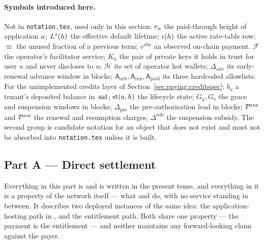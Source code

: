\paragraph{Symbols introduced here.}
Not in \texttt{notation.tex}, used only in this section: $e_{a}$ the paid-through height of
application $a$; $L^{\ast}(h)$ the effective default lifetime; $\iota(h)$ the active
rate-table row; $\varpi$ the unused fraction of a previous term; $v^{\mathrm{obs}}$ an observed
on-chain payment.  $\mathcal{F}$
the operator's facilitator service; $K_u$ the pair of private keys it holds in trust for user $u$ and
never discloses to $u$; $\mathcal{H}$ its set
of operator hot wallets;  $\Delta_{\mathrm{adv}}$ its
early-renewal advance window in blocks; $\mathsf{A}_{\mathrm{orb}}, \mathsf{A}_{\mathrm{ren}},
\mathsf{A}_{\mathrm{paid}}$ its three hardcoded allowlists. For the unimplemented credits layer of
Section~\ref{sec:paying:creditspec}: $b_u$ a tenant's deposited balance in $\,\mathrm{sat}$;
$\mathrm{st}(a,h)$ the lifecycle state; $G_{\mathrm{g}}, G_{\mathrm{s}}$ the grace and
suspension windows in blocks; $\Delta_{\mathrm{pre}}$ the pre-authorisation lead in blocks;
$\mathcal{P}^{\mathrm{ren}}$ and $\mathcal{P}^{\mathrm{res}}$ the renewal and resumption charges;
$\Delta^{\mathrm{sub}}$ the suspension subsidy. The second group is candidate notation for an object
that does not exist and must not be absorbed into \texttt{notation.tex} unless it is built.

\subsection{Part A --- Direct settlement}
\label{sec:paying:direct}

Everything in this part is \shipped and is written in the present tense, and everything in it is a
property of the network itself --- what \fluxd and \FluxOS do, with no service standing in between.
It describes two deployed instances of the same idea: the application-hosting path in \FluxOS, and
the \CumulusVPN entitlement path. Both share one property --- the payment is the entitlement --- and
neither maintains any forward-looking claim against the payer.

